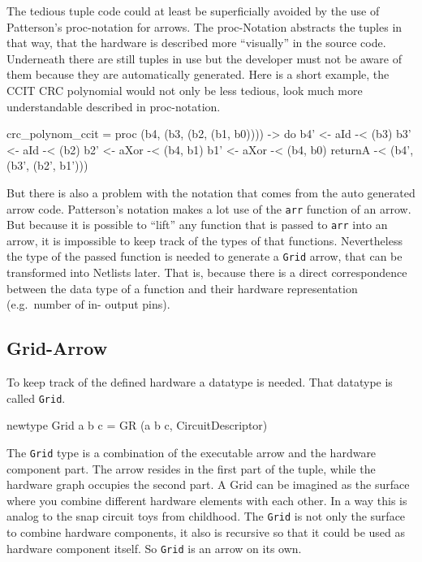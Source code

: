\documentclass[9pt,final,a4paper,leqno]{article}
\newcommand{\hs}[1]{\mbox{\lstinline[basicstyle=\color{textgray}]!#1!}}
\begin{document}
\par
The tedious tuple code could at least be superficially avoided by the use of Patterson's proc-notation for arrows.
\cite{PatersonNewNotation} The proc-Notation abstracts the tuples in that way, that the hardware is described more ``visually'' in the
source code. Underneath there are still tuples in use but the developer must not be aware of them because they are automatically generated.
Here is a short example, the CCIT CRC polynomial would not only be less tedious, look much more understandable described in proc-notation. 
\begin{haskell}
crc_polynom_ccit 
 = proc (b4, (b3, (b2, (b1, b0)))) -> do
     b4' <- aId  -< (b3)
     b3' <- aId  -< (b2)
     b2' <- aXor -< (b4, b1)
     b1' <- aXor -< (b4, b0)
     returnA     -< (b4', (b3', (b2', b1')))
\end{haskell} 

\par
But there is also a problem with the notation that comes from the auto generated arrow code. Patterson's notation makes a lot use of the
\hs{arr} function of an arrow. But because it is possible to ``lift'' any function that is passed to \hs{arr} into an arrow, it is
impossible to keep track of the types of that functions. Nevertheless the type of the passed function is needed to generate a \hs{Grid}
arrow, that can be transformed into Netlists later. That is, because there is a direct correspondence between the data type of a function
and their hardware representation (e.g.\ number of in- output pins).

\subsection{Grid-Arrow}
To keep track of the defined hardware a datatype is needed. That datatype is called \hs{Grid}.
\begin{haskell}
  newtype Grid a b c = GR (a b c, CircuitDescriptor)
\end{haskell} 
The \hs{Grid} type is a combination of the executable arrow and the hardware component part. The arrow resides in the first part of the
tuple, while the hardware graph occupies the second part. A Grid can be imagined as the surface where you combine different hardware
elements with each other. In a way this is analog to the snap circuit toys from childhood. The \hs{Grid} is not only the surface to combine
hardware components, it also is recursive so that it could be used as hardware component itself. So \hs{Grid} is an arrow on its own. 
\end{document}
